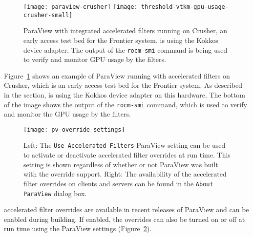 \begin{figure}[t]
  \texttt{[image: paraview-crusher]}
  \texttt{[image: threshold-vtkm-gpu-usage-crusher-small]}
  \caption{
    ParaView with integrated \vtkm accelerated filters running on Crusher, an early access test bed for the Frontier system.
    \vtkm is using the Kokkos device adapter.
    The output of the \texttt{rocm-smi} command is being used to verify and monitor GPU usage by the filters.
  }
  \label{fig:paraview-crusher}
\end{figure}

Figure~\ref{fig:paraview-crusher} shows an example of ParaView running with \vtkm accelerated filters on Crusher, which is an early access test bed for the Frontier system.
As described in the  section, \vtkm is using the Kokkos device adapter on this hardware.
The bottom of the image shows the output of the \texttt{rocm-smi} command, which is used to verify and monitor the GPU usage by the filters.

\begin{figure}[htb]
  \texttt{[image: pv-override-settings]}
  \caption{
    Left: The \texttt{Use Accelerated Filters} ParaView setting can be used to activate or deactivate accelerated filter overrides at run time.
    This setting is shown regardless of whether or not ParaView was built with the override support.
    Right: The availability of the accelerated filter overrides on clients and servers can be found in the \texttt{About ParaView} dialog box.
  }
  \label{fig:paraview_settings}
\end{figure}

\vtkm accelerated filter overrides are available in recent releases of ParaView and can be enabled during building.
If enabled, the overrides can also be turned on or off at run time using the ParaView settings (Figure~\ref{fig:paraview_settings}).


